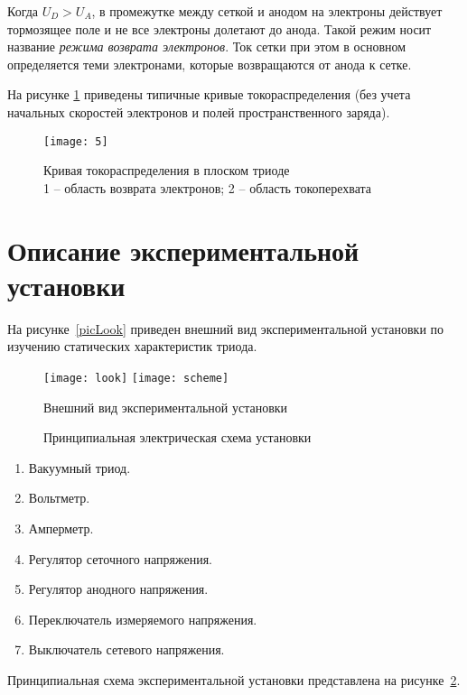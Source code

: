 Когда \( U_D > U_A \), в промежутке между сеткой и анодом на электроны
действует тормозящее поле и не все электроны долетают до анода. Такой режим
носит название \emph{режима возврата электронов}. Ток сетки при этом в основном
определяется теми электронами, которые возвращаются от анода к сетке.

На рисунке \ref{pic5} приведены типичные кривые токораспределения (без учета
начальных скоростей электронов и полей пространственного заряда).

\begin{figure}[ht]
  \center
  \texttt{[image: 5]}
  \caption{Кривая токораспределения в плоском триоде\\
  1 -- область возврата электронов; 2 -- область токоперехвата}
  \label{pic5}
\end{figure}

\section{Описание экспериментальной установки}

На рисунке~\ref{picLook} приведен внешний вид экспериментальной установки по
изучению статических характеристик триода.

\begin{figure}[ht]
  \center
  \texttt{[image: look]} \hfill
  \texttt{[image: scheme]} \\
  \parbox{.39\textwidth}{\caption{Внешний вид экспериментальной установки}
      \label{picLook}} \hfill
  \parbox{.6\textwidth}{\caption{Принципиальная электрическая схема
      установки} \label{picScheme}}
\end{figure}

\begin{enumerate}
  \item Вакуумный триод.
  \item Вольтметр.
  \item Амперметр.
  \item Регулятор сеточного напряжения.
  \item Регулятор анодного напряжения.
  \item Переключатель измеряемого напряжения.
  \item Выключатель сетевого напряжения.
\end{enumerate}

Принципиальная схема экспериментальной установки представлена на
рисунке~\ref{picScheme}.

